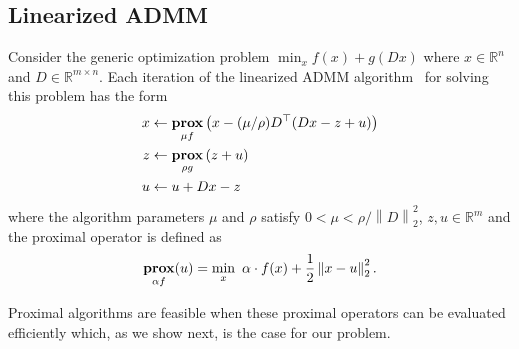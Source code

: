 \documentclass{article}
\newcommand{\norm}[1]{\left\lVert #1 \right\rVert}
\DeclareMathOperator*{\prox}{\bf prox}
\begin{document}
\subsection{Linearized ADMM}
\label{sec:linADMM}


Consider the generic optimization problem
$\min_x f(x)+g(Dx)$
where $x\in \mathbb{R}^n$ and $D\in \mathbb{R}^{m\times n}$. Each
iteration of the linearized ADMM
algorithm~\citep{parikh_proximal_2014} for solving this problem 
has the form
\begin{align}
x & \leftarrow \prox_{\mu f} \left(x - (\mu/\rho)D^\top (D x - z + u )\right)\\
z & \leftarrow \prox_{\rho g} \left(z + u\right) \label{eq:linADMM_steps}\\
u & \leftarrow u + D x - z
\end{align}
where the algorithm parameters $\mu$ and $\rho$ satisfy $0 < \mu < \rho/\norm{D}_2^2$, $z,u\in \mathbb{R}^m$ and the proximal operator is defined as
\begin{equation}
 \prox_{\alpha f}(u) = \min_x \,\, \alpha \cdot f(x)+\frac{1}{2} \norm{ x-u}_2^2.
\label{eq:linADMM_prox}
\end{equation}


Proximal
algorithms are feasible when these proximal operators can be
evaluated efficiently which, as we show next, is the case for our
problem.  
\end{document}

